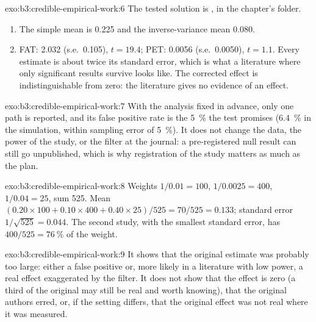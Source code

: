 \begin{solution}{exo:b3:credible-empirical-work:6}
The tested solution is , in the chapter's 
folder.
\begin{enumerate}
\item The simple mean is 0.225 and the inverse-variance mean 0.080.
\item FAT: 2.032 (s.e.\ 0.105), $t = 19.4$; PET: 0.0056 (s.e.\ 0.0050), $t = 1.1$.
Every estimate is about twice its standard error, which is what a literature
where only significant results survive looks like. The corrected effect is
indistinguishable from zero: the literature gives no evidence of an effect.
\end{enumerate}
\end{solution}

\begin{solution}{exo:b3:credible-empirical-work:7}
With the analysis fixed in advance, only one path is reported, and its false
positive rate is the 5~\% the test promises (6.4~\% in the simulation, within
sampling error of 5~\%). %
It does not change the data, the power of the study, or the filter at the
journal: a pre-registered null result can still go unpublished, which is why
registration of the study matters as much as the plan.
\end{solution}

\begin{solution}{exo:b3:credible-empirical-work:8}
Weights $1/0.01 = 100$, $1/0.0025 = 400$, $1/0.04 = 25$, sum 525. Mean $(0.20 \times
100 + 0.10 \times 400 + 0.40 \times 25)/525 = 70/525 = 0.133$; standard error
$1/\sqrt{525} = 0.044$. The second study, with the smallest standard error, has
$400/525 = 76~\%$ of the weight.
\end{solution}

\begin{solution}{exo:b3:credible-empirical-work:9}
It shows that the original estimate was probably too large: either a false
positive or, more likely in a literature with low power, a real effect
exaggerated by the filter. It does not show that the effect is zero (a third
of the original may still be real and worth knowing), that the original authors
erred, or, if the setting differs, that the original effect was not real where
it was measured.
\end{solution}

